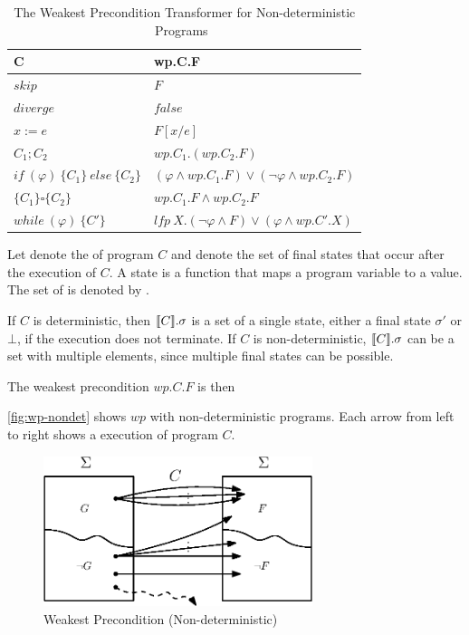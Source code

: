 \begin{table}[ht!]\centering
    \begin{tabular}{ll}
    \hline\hline
      \textbf{C}&\textbf{wp.C.F}    \\ \hline
      $skip$&   $F$   \\
      $diverge$&  $false$\\
      $x:= e $&  $F[x/e]$\\
      $C_1;C_2$&  $wp.C_1.(wp.C_2.F)$\\
      $if\ (\varphi)\ \{C_1\}\ else\ \{C_2\} $&  $(\varphi\wedge wp.C_1.F)\vee(\neg\varphi\wedge wp.C_2.F)$\\
      {\color{Maroon}$\{C_1\}\square \{C_2\}$} & {\color{Maroon}$wp.C_1.F\wedge wp.C_2.F$}\\
      $while\ (\varphi)\ \{C'\}$&  $lfp\ X.(\neg\varphi\wedge F)\vee(\varphi\wedge wp.C'.X)$\\
    \hline\hline
    \end{tabular}
    \caption{The Weakest Precondition Transformer for Non-deterministic Programs~\cite{kaminski19}}
    \label{tab:wp-nondet}
\end{table}

Let  denote the  of program $C$ and  denote the set of final states that  occur after the execution of $C$. 
A state is a function that maps a program variable to a value. The set of  is denoted by . 

If $C$ is deterministic, then $\llbracket {C} \rrbracket.\sigma$ is a set of a single state, either a final state $\sigma'$ or $\bot$, if the execution does not terminate. 
If $C$ is non-deterministic, $\llbracket {C} \rrbracket.\sigma$ can be a set with multiple elements, since multiple final states can be possible. 

The weakest precondition $wp.C.F$ is then 


\autoref{fig:wp-nondet} shows $wp$ with non-deterministic programs. 
Each arrow from left to right shows a  execution of program $C$. 

\begin{figure}[ht!]\centering
\includegraphics[width=0.7\textwidth]{image/wp-nondet.eps}
\caption{Weakest Precondition (Non-deterministic)}
\label{fig:wp-nondet}
\end{figure}








